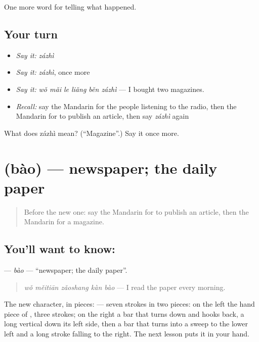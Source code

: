 \begin{grammarlens}[title={What you've built}]
One more word for telling what happened.
\end{grammarlens}

\subsection*{Your turn}
\begin{itemize}
\raggedright
  \item \emph{Say it:} \emph{zázhì}
  \item \emph{Say it:} \emph{zázhì}, once more
  \item \emph{Say it:} \emph{wǒ mǎi le liǎng běn zázhì} — I bought two magazines.
  \item \emph{Recall:} say the Mandarin for the people listening to the radio, then the Mandarin for to publish an article, then say \emph{zázhì} again
\end{itemize}

\begin{tcolorbox}[breakable,colback=teal!4,colframe=teal!35!black,title={Before you move on}]
What does zázhì mean? (\textquotedblleft{}Magazine\textquotedblright{}.) Say it once more.
\end{tcolorbox}
\section[\texorpdfstring{\zh{报} (bào)}{报 (bào)}]{ (bào) — newspaper; the daily paper}

\label{lesson:ZH-C293-bao}



\begin{quote}
Before the new one: say the Mandarin for to publish an article, then the Mandarin for a magazine.
\end{quote}

\subsection*{You'll want to know: }
\textbf{} — \emph{bào} — \textquotedblleft{}newspaper; the daily paper\textquotedblright{}.

\begin{quote}
\textbf{} \emph{wǒ měitiān zǎoshang kàn bào} — I read the paper every morning.
\end{quote}

The new character, in pieces:  — seven strokes in two pieces: on the left the hand piece of , three strokes; on the right a bar that turns down and hooks back, a long vertical down its left side, then a bar that turns into a sweep to the lower left and a long stroke falling to the right. The next lesson puts it in your hand.

